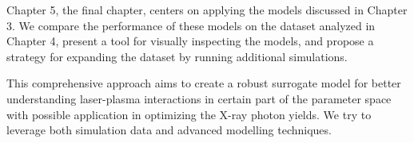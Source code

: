 Chapter 5, the final chapter, centers on applying the models discussed in Chapter 3. We compare the performance of these models on the dataset analyzed in Chapter 4, present a tool for visually inspecting the models, and propose a strategy for expanding the dataset by running additional simulations.

This comprehensive approach aims to create a robust surrogate model for better understanding laser-plasma interactions in certain part of the parameter space with possible application in optimizing the X-ray photon yields.  We try to leverage both simulation data and advanced modelling techniques.

